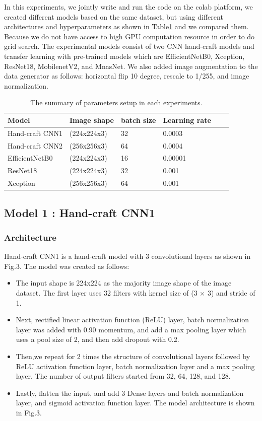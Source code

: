 \documentclass[conference]{IEEEtran}
\begin{document}
In this experiments, we jointly write and run the code on the colab platform, we created different models based on the same dataset, but using different architectures and hyperparameters as shown in Table\ref{T1} and we compared them. Because we do not have access to high GPU computation resource in order to do grid search. The experimental models consist of two CNN hand-craft models and transfer learning with pre-trained models which are EfficientNetB0, Xception, ResNet18, MobilenetV2, and MnasNet. We also added image augmentation to the data generator as follows: horizontal flip 10 degree, rescale to 1/255, and image normalization. 

\begin{table}[h]\centering
\caption{The summary of parameters setup in each experiments.}\label{T1}
\begin{tabularx}{\linewidth}{l l l l l l}
\toprule
Model&Image shape&batch size&Learning rate\\
\midrule
Hand-craft CNN1&(224x224x3)&32&0.0003\\
Hand-craft CNN2&(256x256x3)&64& 0.0004\\
EfficientNetB0&(224x224x3)&16& 0.00001\\
ResNet18&(224x224x3)&32& 0.001\\
Xception&(256x256x3)&64& 0.001\\
\bottomrule
\end{tabularx}
\end{table}


\subsection{Model 1 : Hand-craft CNN1}
\subsubsection{Architecture}
Hand-craft CNN1 is a hand-craft model with 3 convolutional layers as shown in Fig.3. The model was created as follows:
\begin{itemize}
    \item The input shape is 224x224 as the majority image shape of the image dataset. The first layer uses 32 filters with kernel size of (3 × 3) and stride of 1.
    \item Next, rectified linear activation function (ReLU) layer, batch normalization layer was added with 0.90 momentum, and add a max pooling layer which uses a pool size of 2, and then add dropout with 0.2.
    \item Then,we repeat for 2 times the structure of convolutional layers followed by ReLU activation function layer, batch normalization layer and a max pooling layer. The number of output filters started from 32, 64, 128, and 128. 
    \item Lastly, flatten the input, and add 3 Dense layers and batch normalization layer, and sigmoid activation function layer.
    The model architecture is shown in Fig.3.
    
\end{itemize}
\end{document}
